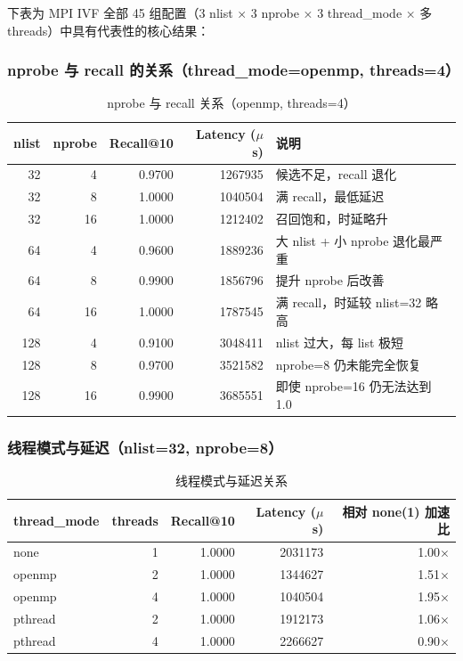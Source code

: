 \documentclass[a4paper]{article}
\begin{document}
下表为 MPI IVF 全部 45 组配置（3 nlist × 3 nprobe × 3 thread\_mode × 多 threads）中具有代表性的核心结果：

\subsubsection{nprobe 与 recall 的关系（thread\_mode=openmp, threads=4）}

\begin{table}[H]
\centering
\small
\begin{tabular}{rrrrl}
\toprule
nlist & nprobe & Recall@10 & Latency ($\mu$s) & 说明 \\
\midrule
32 & 4 & 0.9700 & 1267935 & 候选不足，recall 退化 \\
32 & 8 & 1.0000 & 1040504 & 满 recall，最低延迟 \\
32 & 16 & 1.0000 & 1212402 & 召回饱和，时延略升 \\
64 & 4 & 0.9600 & 1889236 & 大 nlist + 小 nprobe 退化最严重 \\
64 & 8 & 0.9900 & 1856796 & 提升 nprobe 后改善 \\
64 & 16 & 1.0000 & 1787545 & 满 recall，时延较 nlist=32 略高 \\
128 & 4 & 0.9100 & 3048411 & nlist 过大，每 list 极短 \\
128 & 8 & 0.9700 & 3521582 & nprobe=8 仍未能完全恢复 \\
128 & 16 & 0.9900 & 3685551 & 即使 nprobe=16 仍无法达到 1.0 \\
\bottomrule
\end{tabular}
\caption{nprobe 与 recall 关系（openmp, threads=4）}
\end{table}

\subsubsection{线程模式与延迟（nlist=32, nprobe=8）}

\begin{table}[H]
\centering
\small
\begin{tabular}{lrrrr}
\toprule
thread\_mode & threads & Recall@10 & Latency ($\mu$s) & 相对 none(1) 加速比 \\
\midrule
none & 1 & 1.0000 & 2031173 & 1.00$\times$ \\
openmp & 2 & 1.0000 & 1344627 & 1.51$\times$ \\
openmp & 4 & 1.0000 & 1040504 & 1.95$\times$ \\
pthread & 2 & 1.0000 & 1912173 & 1.06$\times$ \\
pthread & 4 & 1.0000 & 2266627 & 0.90$\times$ \\
\bottomrule
\end{tabular}
\caption{线程模式与延迟关系}
\end{table}
\end{document}
